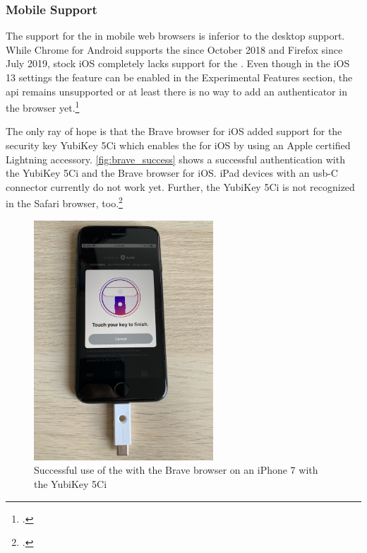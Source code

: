 \subsubsection{Mobile Support}

The support for the \wa{} in mobile web browsers is inferior to the desktop support. While Chrome for Android supports the \wa{} since October 2018 and Firefox since July 2019, stock iOS completely lacks support for the \wa. Even though in the iOS 13 settings the feature can be enabled in the \frqq Experimental Features\flqq{} section, the \gls{api} remains unsupported or at least there is no way to add an authenticator in the browser yet.\footcites[See][]{chrome-android-webauthn}[See]{firefox-android-webauthn}

The only ray of hope is that the Brave browser for iOS added support for the security key \frqq YubiKey 5Ci\flqq{} which enables the \wa{} for iOS by using an Apple certified Lightning accessory. \autoref{fig:brave_success} shows a successful authentication with the YubiKey 5Ci and the Brave browser for iOS. iPad devices with an \gls{usb}-C connector currently do not work yet. Further, the YubiKey 5Ci is not recognized in the Safari browser, too.\footcites[See][]{brave-ios}[See][]{brave-now-available}[See][]{fido-ct-6}

\begin{figure}[hbt]
	\centering
	\includegraphics[width=0.6\textwidth]{pics/brave_success_5ci.eps}
	\caption[Successful use of the \wa{} with the Brave browser on an iPhone 7 with the YubiKey 5Ci]{Successful use of the \wa{} with the Brave browser on an iPhone 7 with the YubiKey 5Ci\footnotemark}
	\label{fig:brave_success}
\end{figure}

